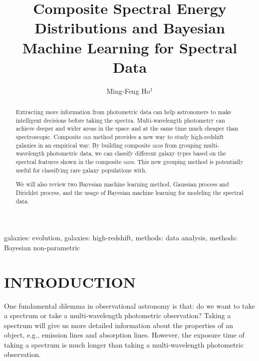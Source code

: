 \documentclass{ar-1col}
\begin{document}

\title{Composite Spectral Energy Distributions and Bayesian Machine Learning for Spectral Data}

\author{Ming-Feng Ho$^1$
}

\begin{abstract}
Extracting more information from photometric data can help astronomers to make intelligent decisions before taking the spectra.
Multi-wavelength photometry can achieve deeper and wider areas in the space and at the same time much cheaper than spectroscopic.
Composite \textsc{sed} method provides a new way to study high-redshift galaxies in an empirical way.
By building composite \textsc{sed}s from grouping multi-wavelength photometric data, we can classify different galaxy types based on the spectral features shown in the composite \textsc{sed}s.
This new grouping method is potentially useful for classifying rare galaxy populations with.

We will also review two Bayesian machine learning method, Gaussian process and Dirichlet process, and the usage of Bayesian machine learning for modeling the spectral data.
\end{abstract}

\begin{keywords}
galaxies: evolution, galaxies: high-redshift, methods: data analysis, methods: Bayesian non-parametric
\end{keywords}
\maketitle

\tableofcontents


\section{INTRODUCTION}
One fundamental dilemma in observational astronomy is that: do we want to take a spectrum or take a multi-wavelength photometric observation? 
Taking a spectrum will give us more detailed information about the properties of an object, e.g., emission lines and absorption lines. 
However, the exposure time of taking a spectrum is much longer than taking a multi-wavelength photometric observation. 
\end{document}
